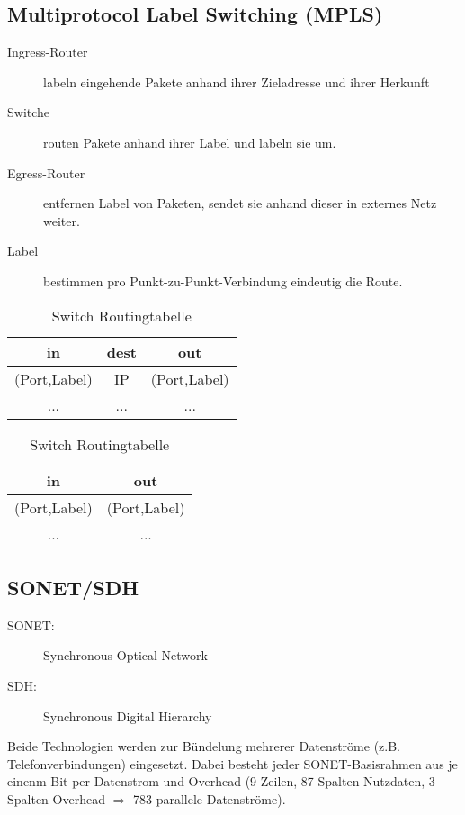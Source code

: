 \documentclass[a4paper]{article}
\begin{document}
\subsection{Multiprotocol Label Switching (MPLS)}
\begin{description}
    \item[Ingress-Router] labeln eingehende Pakete anhand ihrer Zieladresse und ihrer Herkunft
    \item[Switche] routen Pakete anhand ihrer Label und labeln sie um.
    \item[Egress-Router] entfernen Label von Paketen, sendet sie anhand dieser in externes Netz weiter.
    \item[Label] bestimmen pro Punkt-zu-Punkt-Verbindung eindeutig die Route.
\end{description}

\begin{table}[ht]
\begin{minipage}{0.5\textwidth}
	\centering
	\begin{tabular}{c|c|c}
		in & dest & out\\
		\hline
		(Port,Label) & IP & (Port,Label)\\
		... & ... & ...
	\end{tabular}
	\caption{Ingress/Egress Routingtabelle}
\end{minipage}
\begin{minipage}{0.5\textwidth}
	\centering
	\begin{tabular}{c|c}
		in & out\\
		\hline
		(Port,Label)  & (Port,Label)\\
		... & ...
	\end{tabular}
	\caption{Switch Routingtabelle}
\end{minipage}
\end{table}

\subsection{SONET/SDH}
\begin{description}
    \item[SONET:] Synchronous Optical Network
    \item[SDH:] Synchronous Digital Hierarchy
\end{description}
Beide Technologien werden zur Bündelung mehrerer Datenströme (z.B. Telefonverbindungen) eingesetzt. Dabei besteht jeder SONET-Basisrahmen aus je einenm Bit per Datenstrom und Overhead (9 Zeilen, 87 Spalten Nutzdaten, 3 Spalten Overhead $\Rightarrow$ 783 parallele Datenströme).
\end{document}
